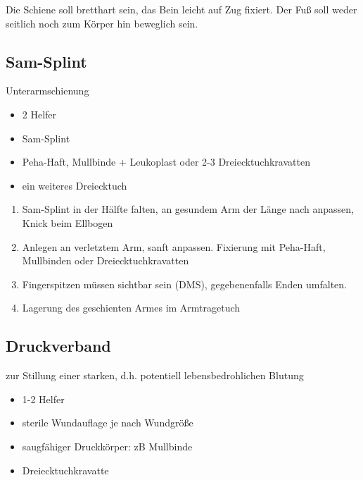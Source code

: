 Die Schiene soll bretthart sein, das Bein leicht auf Zug fixiert. Der
Fu{\ss} soll weder seitlich noch zum K\"orper hin beweglich sein.



\subsection{Sam-Splint}

Unterarmschienung


\begin{itemize}
\item 2 Helfer
\item Sam-Splint
\item Peha-Haft, Mullbinde + Leukoplast oder 2-3 Dreiecktuchkravatten
\item ein weiteres Dreiecktuch
\end{itemize}



\begin{enumerate}
\item Sam-Splint in der H\"alfte falten, an gesundem Arm der L\"ange
nach anpassen, Knick beim Ellbogen
\item Anlegen an verletztem Arm, sanft anpassen. Fixierung mit
Peha-Haft, Mullbinden oder Dreiecktuchkravatten
\item Fingerspitzen m\"ussen sichtbar sein (DMS), gegebenenfalls Enden
umfalten.
\item Lagerung des geschienten Armes im Armtragetuch
\end{enumerate}




\subsection{Druckverband}

zur Stillung einer starken, d.h. potentiell lebensbedrohlichen Blutung


\begin{itemize}
\item 1-2 Helfer
\item sterile Wundauflage je nach Wundgr\"o{\ss}e
\item saugf\"ahiger Druckk\"orper: zB Mullbinde
\item Dreiecktuchkravatte
\end{itemize}

